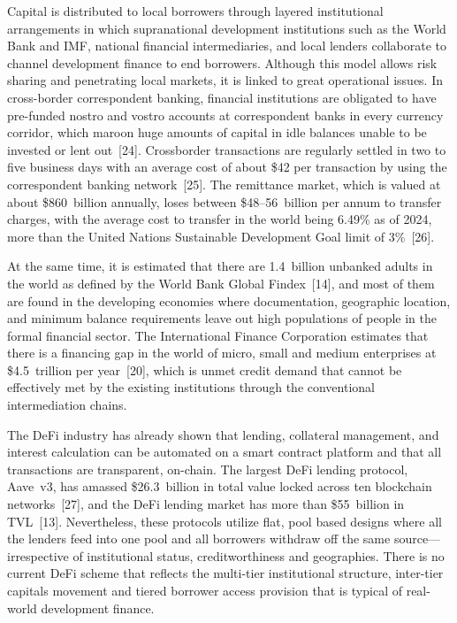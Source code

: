 \documentclass[12pt,a4paper]{report}
\begin{document}
Capital is distributed to local borrowers through layered institutional arrangements in which supranational development institutions such as the World Bank and IMF, national financial intermediaries, and local lenders collaborate to channel development finance to end borrowers. Although this model allows risk sharing and penetrating local markets, it is linked to great operational issues. In cross-border correspondent banking, financial institutions are obligated to have pre-funded nostro and vostro accounts at correspondent banks in every currency corridor, which maroon huge amounts of capital in idle balances unable to be invested or lent out~[24]. Crossborder transactions are regularly settled in two to five business days with an average cost of about \$42 per transaction by using the correspondent banking network~[25]. The remittance market, which is valued at about \$860~billion annually, loses between \$48--56~billion per annum to transfer charges, with the average cost to transfer in the world being 6.49\% as of 2024, more than the United Nations Sustainable Development Goal limit of 3\%~[26].

At the same time, it is estimated that there are 1.4~billion unbanked adults in the world as defined by the World Bank Global Findex~[14], and most of them are found in the developing economies where documentation, geographic location, and minimum balance requirements leave out high populations of people in the formal financial sector. The International Finance Corporation estimates that there is a financing gap in the world of micro, small and medium enterprises at \$4.5~trillion per year~[20], which is unmet credit demand that cannot be effectively met by the existing institutions through the conventional intermediation chains.

The DeFi industry has already shown that lending, collateral management, and interest calculation can be automated on a smart contract platform and that all transactions are transparent, on-chain. The largest DeFi lending protocol, Aave~v3, has amassed \$26.3~billion in total value locked across ten blockchain networks~[27], and the DeFi lending market has more than \$55~billion in TVL~[13]. Nevertheless, these protocols utilize flat, pool based designs where all the lenders feed into one pool and all borrowers withdraw off the same source---irrespective of institutional status, creditworthiness and geographies. There is no current DeFi scheme that reflects the multi-tier institutional structure, inter-tier capitals movement and tiered borrower access provision that is typical of real-world development finance.
\end{document}
